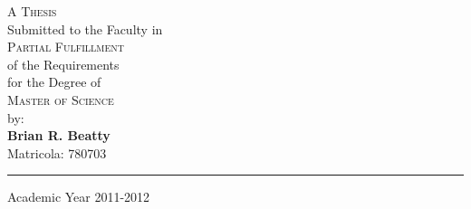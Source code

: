 \begin{titlepage}
\begin{centering}
  {\small{\Large\scshape A Thesis}\\Submitted to the Faculty in\\{\Large\scshape Partial Fulfillment}\\of the Requirements\\
  	for the Degree of\\{\Large\scshape Master of Science}\\by:\\}
  \vspace*{0.5em}\textbf{\LARGE Brian R. Beatty}\\ \vspace*{0.5em}\small Matricola: 780703 \\ 
\vspace*{1em}
\rule{\linewidth}{0.5mm}

\end{centering}
\vspace*{0.5cm}
\begin{center}
  Academic Year 2011-2012
\end{center} \clearpage

\end{titlepage}